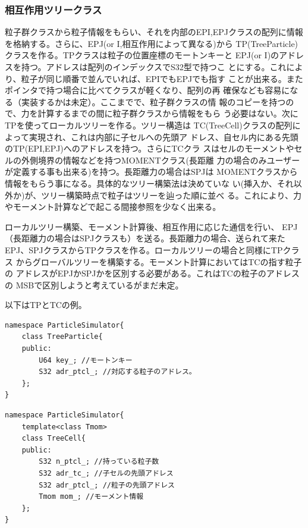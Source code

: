 \subsubsection{相互作用ツリークラス}


粒子群クラスから粒子情報をもらい、それを内部のEPI,EPJクラスの配列に情報
を格納する。さらに、EPJ(or I,相互作用によって異なる)から
TP(TreeParticle)クラスを作る。TPクラスは粒子の位置座標のモートンキーと
EPJ(or I)のアドレスを持つ。アドレスは配列のインデックスでS32型で持つこ
とにする。これにより、粒子が同じ順番で並んでいれば、EPIでもEPJでも指す
ことが出来る。またポインタで持つ場合に比べてクラスが軽くなり、配列の再
確保なども容易になる（実装するかは未定）。ここまでで、粒子群クラスの情
報のコピーを持つので、力を計算するまでの間に粒子群クラスから情報をもら
う必要はない。次にTPを使ってローカルツリーを作る。ツリー構造は
TC(TreeCell)クラスの配列によって実現され、これは内部に子セルへの先頭ア
ドレス、自セル内にある先頭のTP(EPI,EPJ)へのアドレスを持つ。さらにTCクラ
スはセルのモーメントやセルの外側境界の情報などを持つMOMENTクラス(長距離
力の場合のみユーザーが定義する事も出来る)を持つ。長距離力の場合はSPJは
MOMENTクラスから情報をもらう事になる。具体的なツリー構築法は決めていな
い(挿入か、それ以外か)が、ツリー構築時点で粒子はツリーを辿った順に並べ
る。これにより、力やモーメント計算などで起こる間接参照を少なく出来る。

ローカルツリー構築、モーメント計算後、相互作用に応じた通信を行い、
EPJ（長距離力の場合はSPJクラスも）を送る。長距離力の場合、送られて来た
EPJ、SPJクラスからTPクラスを作る。ローカルツリーの場合と同様にTPクラス
からグローバルツリーを構築する。モーメント計算においてはTCの指す粒子の
アドレスがEPJかSPJかを区別する必要がある。これはTCの粒子のアドレスの
MSBで区別しようと考えているがまだ未定。

以下はTPとTCの例。

\begin{lstlisting}[caption=TreeParticle]
namespace ParticleSimulator{
    class TreeParticle{
    public:
        U64 key_; //モートンキー
        S32 adr_ptcl_; //対応する粒子のアドレス。
    };
}
\end{lstlisting}

\begin{lstlisting}[caption=TreeCell]
namespace ParticleSimulator{
    template<class Tmom>
    class TreeCell{
    public:
        S32 n_ptcl_; //持っている粒子数
        S32 adr_tc_; //子セルの先頭アドレス
        S32 adr_ptcl_; //粒子の先頭アドレス
        Tmom mom_; //モーメント情報
    };
}
\end{lstlisting}

